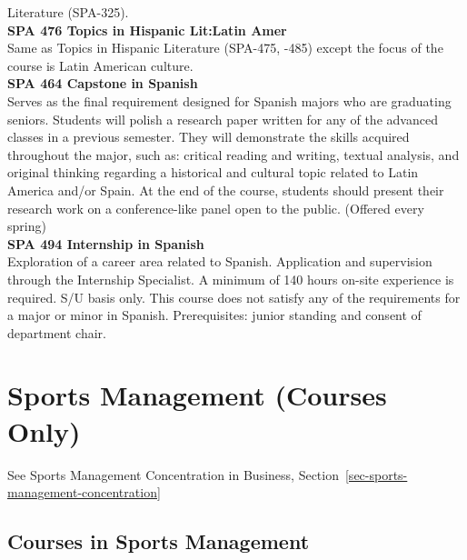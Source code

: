 \documentclass[
  letterpaper,
]{scrbook}
\begin{document}
Literature (SPA-325).\\
\textbf{SPA 476 Topics in Hispanic Lit:Latin Amer}\\
Same as Topics in Hispanic Literature (SPA-475, -485) except the focus
of the course is Latin American culture.\\
\textbf{SPA 464 Capstone in Spanish}\\
Serves as the final requirement designed for Spanish majors who are
graduating seniors. Students will polish a research paper written for
any of the advanced classes in a previous semester. They will
demonstrate the skills acquired throughout the major, such as: critical
reading and writing, textual analysis, and original thinking regarding a
historical and cultural topic related to Latin America and/or Spain. At
the end of the course, students should present their research work on a
conference-like panel open to the public. (Offered every spring)\\
\textbf{SPA 494 Internship in Spanish}\\
Exploration of a career area related to Spanish. Application and
supervision through the Internship Specialist. A minimum of 140 hours
on-site experience is required. S/U basis only. This course does not
satisfy any of the requirements for a major or minor in Spanish.
Prerequisites: junior standing and consent of department chair.

\section{Sports Management (Courses
Only)}\label{sports-management-courses-only}

See Sports Management Concentration in Business,
Section~\ref{sec-sports-management-concentration}

\subsection{Courses in Sports
Management}\label{courses-in-sports-management}
\end{document}
